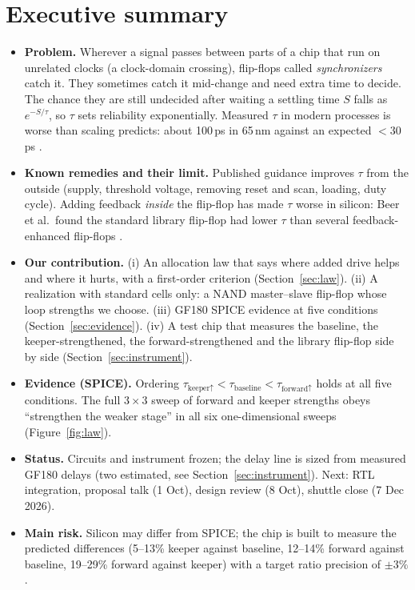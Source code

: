 \documentclass[11pt]{article}
\begin{document}
\tableofcontents
\newpage

\section{Executive summary}
\begin{itemize}
\item \textbf{Problem.} Wherever a signal passes between parts of a chip that run on unrelated clocks (a clock-domain
  crossing), flip-flops called \emph{synchronizers} catch it. They sometimes catch it mid-change and need extra time
  to decide. The chance they are still undecided after waiting a settling time $S$ falls as $e^{-S/\tau}$, so $\tau$
  sets reliability exponentially. Measured $\tau$ in modern
  processes is worse than scaling predicts: about 100\,ps in 65\,nm against an expected $<30$\,ps \cite{beer2010}.
\item \textbf{Known remedies and their limit.} Published guidance \cite{beer2015} improves $\tau$ from the outside
  (supply, threshold voltage, removing reset and scan, loading, duty cycle). Adding feedback \emph{inside} the
  flip-flop has made $\tau$ worse in silicon: Beer et al.\ found the standard library flip-flop had lower $\tau$
  than several feedback-enhanced flip-flops \cite{beer2011}.
\item \textbf{Our contribution.} (i) An allocation law that says where added drive helps and where it hurts, with a
  first-order criterion (Section~\ref{sec:law}). (ii) A realization with standard cells only: a NAND master--slave
  flip-flop whose loop strengths we choose. (iii) GF180 SPICE evidence at five conditions
  (Section~\ref{sec:evidence}). (iv) A test chip that measures the baseline, the keeper-strengthened, the
  forward-strengthened and the library flip-flop side by side (Section~\ref{sec:instrument}).
\item \textbf{Evidence (SPICE).} Ordering $\tau_{\text{keeper}\uparrow} < \tau_{\text{baseline}} <
  \tau_{\text{forward}\uparrow}$ holds at all five conditions. The full $3\times3$ sweep of forward and keeper
  strengths obeys ``strengthen the weaker stage'' in all six one-dimensional sweeps (Figure~\ref{fig:law}).
\item \textbf{Status.} Circuits and instrument frozen; the delay line is sized from measured GF180 delays (two estimated, see Section~\ref{sec:instrument}).
  Next: RTL integration, proposal talk (1 Oct), design review (8 Oct), shuttle close (7 Dec 2026).
\item \textbf{Main risk.} Silicon may differ from SPICE; the chip is built to measure the predicted differences
  (5--13\% keeper against baseline, 12--14\% forward against baseline, 19--29\% forward against keeper) with a target
  ratio precision of $\pm3\%$.
\end{itemize}
\end{document}
